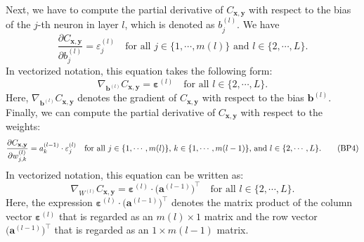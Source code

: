 Next, we have to compute the partial derivative of $C_{\mathbf{x}, \mathbf{y}}$ with respect to the bias of the
$j$-th neuron in layer $l$, which is denoted as $b_j^{(l)}$.  We have
\begin{equation}
  \label{eq:BP3}
  \frac{\partial C_{\mathbf{x}, \mathbf{y}}}{\partial b_j^{(l)}} = \varepsilon_j^{(l)}
  \quad \mbox{for all $j \in \{1,\cdots,m(l)\}$ and $l \in \{2, \cdots,L\}$.}
  \tag{BP3}
\end{equation}
In vectorized notation, this equation takes the following form:
\begin{equation}
  \label{eq:BP3v}
  \nabla_{\mathbf{b}^{(l)}} C_{\mathbf{x}, \mathbf{y}} = \boldsymbol{\varepsilon}^{(l)}
  \quad \mbox{for all $l \in \{2, \cdots,L\}$.}
  \tag{BP3v}
\end{equation}
Here, $\nabla_{\mathbf{b}^{(l)}} C_{\mathbf{x}, \mathbf{y}}$ denotes the gradient of $C_{\mathbf{x},
  \mathbf{y}}$ with respect to the bias $\mathbf{b}^{(l)}$.
Finally, we can compute the  partial derivative of $C_{\mathbf{x}, \mathbf{y}}$ with respect to the weights:
\begin{equation}
  \label{eq:BP4}
  \frac{\partial C_{\mathbf{x}, \mathbf{y}}}{\partial w_{j,k}^{(l)}} = a_k^{(l-1)} \cdot \varepsilon_j^{(l)}
  \quad \mbox{for all $j \in \{1,\cdots,m(l)\}$, $ k \in \{1,\cdots,m(l-1)\}$, and $l \in \{2, \cdots,L\}$.}
  \tag{BP4}
\end{equation}
In vectorized notation, this equation can be written as:
\begin{equation}
  \label{eq:BP4v}
  \nabla_{W^{(l)}} C_{\mathbf{x}, \mathbf{y}} = \boldsymbol{\varepsilon}^{(l)} \cdot \bigl(\mathbf{a}^{(l-1)}\bigr)^\top
  \quad \mbox{for all $l \in \{2, \cdots,L\}$.}
  \tag{BP4v}
\end{equation}
Here, the expression $\boldsymbol{\varepsilon}^{(l)} \cdot \bigl(\mathbf{a}^{(l-1)}\bigr)^\top$ denotes the matrix
product of the column vector $\boldsymbol{\varepsilon}^{(l)}$ that is regarded as an $m(l) \times 1$ matrix and the
row vector $\bigl(\mathbf{a}^{(l-1)}\bigr)^\top$ that is regarded as an $1 \times m(l-1)$ matrix.

